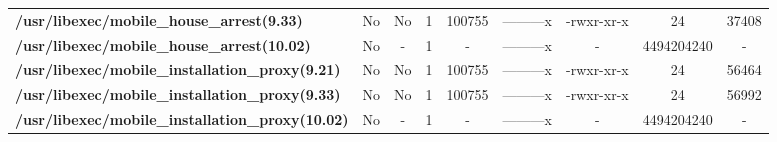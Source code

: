 \begin{center}
{\begin{tabular}{|>{\bfseries} l | C | C | C | C | C | C | C | C |}
					/usr/libexec/mobile\_house\_arrest(9.33) & No & No & \color{green}1 & \color{red}100755 & \color{green}---------x & \color{red}-rwxr-xr-x & \color{green}24 & \color{red}37408\\ 
					/usr/libexec/mobile\_house\_arrest(10.02) & No & - & 1 & - & ---------x & - & 4494204240 & -\\ 
					/usr/libexec/mobile\_installation\_proxy(9.21) & No & No & \color{green}1 & \color{red}100755 & \color{green}---------x & \color{red}-rwxr-xr-x & \color{green}24 & \color{red}56464\\ 
					/usr/libexec/mobile\_installation\_proxy(9.33) & No & No & \color{green}1 & \color{red}100755 & \color{green}---------x & \color{red}-rwxr-xr-x & \color{green}24 & \color{red}56992\\ 
					/usr/libexec/mobile\_installation\_proxy(10.02) & No & - & 1 & - & ---------x & - & 4494204240 & -\\ 

			\end{tabular}
		}
	\end{center}



